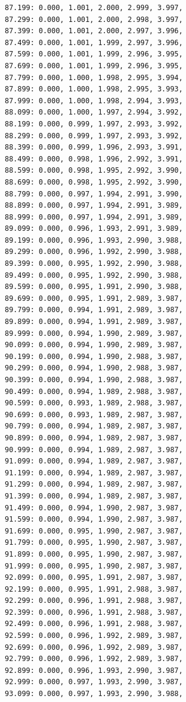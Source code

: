 \documentclass[12pt, a4paper]{article}
\begin{document}
\begin{scriptsize}
\begin{ttfamily}
\begin{lstlisting}
87.199: 0.000, 1.001, 2.000, 2.999, 3.997, 
87.299: 0.000, 1.001, 2.000, 2.998, 3.997, 
87.399: 0.000, 1.001, 2.000, 2.997, 3.996, 
87.499: 0.000, 1.001, 1.999, 2.997, 3.996, 
87.599: 0.000, 1.001, 1.999, 2.996, 3.995, 
87.699: 0.000, 1.001, 1.999, 2.996, 3.995, 
87.799: 0.000, 1.000, 1.998, 2.995, 3.994, 
87.899: 0.000, 1.000, 1.998, 2.995, 3.993, 
87.999: 0.000, 1.000, 1.998, 2.994, 3.993, 
88.099: 0.000, 1.000, 1.997, 2.994, 3.992, 
88.199: 0.000, 0.999, 1.997, 2.993, 3.992, 
88.299: 0.000, 0.999, 1.997, 2.993, 3.992, 
88.399: 0.000, 0.999, 1.996, 2.993, 3.991, 
88.499: 0.000, 0.998, 1.996, 2.992, 3.991, 
88.599: 0.000, 0.998, 1.995, 2.992, 3.990, 
88.699: 0.000, 0.998, 1.995, 2.992, 3.990, 
88.799: 0.000, 0.997, 1.994, 2.991, 3.990, 
88.899: 0.000, 0.997, 1.994, 2.991, 3.989, 
88.999: 0.000, 0.997, 1.994, 2.991, 3.989, 
89.099: 0.000, 0.996, 1.993, 2.991, 3.989, 
89.199: 0.000, 0.996, 1.993, 2.990, 3.988, 
89.299: 0.000, 0.996, 1.992, 2.990, 3.988, 
89.399: 0.000, 0.995, 1.992, 2.990, 3.988, 
89.499: 0.000, 0.995, 1.992, 2.990, 3.988, 
89.599: 0.000, 0.995, 1.991, 2.990, 3.988, 
89.699: 0.000, 0.995, 1.991, 2.989, 3.987, 
89.799: 0.000, 0.994, 1.991, 2.989, 3.987, 
89.899: 0.000, 0.994, 1.991, 2.989, 3.987, 
89.999: 0.000, 0.994, 1.990, 2.989, 3.987, 
90.099: 0.000, 0.994, 1.990, 2.989, 3.987, 
90.199: 0.000, 0.994, 1.990, 2.988, 3.987, 
90.299: 0.000, 0.994, 1.990, 2.988, 3.987, 
90.399: 0.000, 0.994, 1.990, 2.988, 3.987, 
90.499: 0.000, 0.994, 1.989, 2.988, 3.987, 
90.599: 0.000, 0.993, 1.989, 2.988, 3.987, 
90.699: 0.000, 0.993, 1.989, 2.987, 3.987, 
90.799: 0.000, 0.994, 1.989, 2.987, 3.987, 
90.899: 0.000, 0.994, 1.989, 2.987, 3.987, 
90.999: 0.000, 0.994, 1.989, 2.987, 3.987, 
91.099: 0.000, 0.994, 1.989, 2.987, 3.987, 
91.199: 0.000, 0.994, 1.989, 2.987, 3.987, 
91.299: 0.000, 0.994, 1.989, 2.987, 3.987, 
91.399: 0.000, 0.994, 1.989, 2.987, 3.987, 
91.499: 0.000, 0.994, 1.990, 2.987, 3.987, 
91.599: 0.000, 0.994, 1.990, 2.987, 3.987, 
91.699: 0.000, 0.995, 1.990, 2.987, 3.987, 
91.799: 0.000, 0.995, 1.990, 2.987, 3.987, 
91.899: 0.000, 0.995, 1.990, 2.987, 3.987, 
91.999: 0.000, 0.995, 1.990, 2.987, 3.987, 
92.099: 0.000, 0.995, 1.991, 2.987, 3.987, 
92.199: 0.000, 0.995, 1.991, 2.988, 3.987, 
92.299: 0.000, 0.996, 1.991, 2.988, 3.987, 
92.399: 0.000, 0.996, 1.991, 2.988, 3.987, 
92.499: 0.000, 0.996, 1.991, 2.988, 3.987, 
92.599: 0.000, 0.996, 1.992, 2.989, 3.987, 
92.699: 0.000, 0.996, 1.992, 2.989, 3.987, 
92.799: 0.000, 0.996, 1.992, 2.989, 3.987, 
92.899: 0.000, 0.996, 1.993, 2.990, 3.987, 
92.999: 0.000, 0.997, 1.993, 2.990, 3.987, 
93.099: 0.000, 0.997, 1.993, 2.990, 3.988, 

\end{lstlisting}
\end{ttfamily}
\end{scriptsize}
\end{document}
